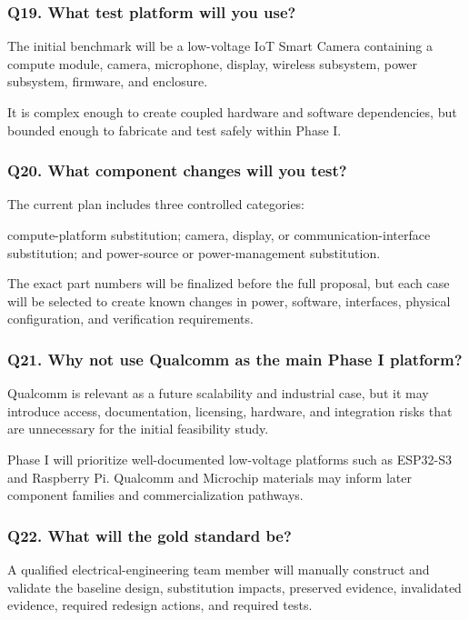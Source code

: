 \documentclass[12pt,letterpaper]{article}
\begin{document}
\subsubsection{Q19. What test platform will you use?}

The initial benchmark will be a low-voltage IoT Smart Camera containing a compute module, camera, microphone, display, wireless subsystem, power subsystem, firmware, and enclosure.

It is complex enough to create coupled hardware and software dependencies, but bounded enough to fabricate and test safely within Phase I.

\subsubsection{Q20. What component changes will you test?}

The current plan includes three controlled categories:

compute-platform substitution;
camera, display, or communication-interface substitution; and
power-source or power-management substitution.

The exact part numbers will be finalized before the full proposal, but each case will be selected to create known changes in power, software, interfaces, physical configuration, and verification requirements.

\subsubsection{Q21. Why not use Qualcomm as the main Phase I platform?}

Qualcomm is relevant as a future scalability and industrial case, but it may introduce access, documentation, licensing, hardware, and integration risks that are unnecessary for the initial feasibility study.

Phase I will prioritize well-documented low-voltage platforms such as ESP32-S3 and Raspberry Pi. Qualcomm and Microchip materials may inform later component families and commercialization pathways.

\subsubsection{Q22. What will the gold standard be?}

A qualified electrical-engineering team member will manually construct and validate the baseline design, substitution impacts, preserved evidence, invalidated evidence, required redesign actions, and required tests.
\end{document}
